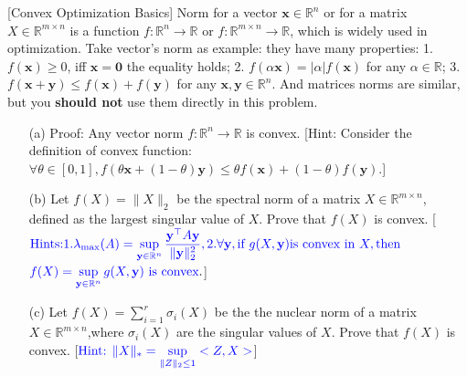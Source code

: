 \item {} [Convex Optimization Basics] Norm for a vector $\mathbf{x}\in\mathbb{R}^n$ or for a matrix $X\in\mathbb{R}^{m\times n}$ is a function $f:\mathbb{R}^{n}\rightarrow\mathbb{R}$ or $f:\mathbb{R}^{m\times n}\rightarrow\mathbb{R}$, which is widely used in optimization. Take vector's norm as example: they have many properties: 1. $f(\mathbf{x})\geq 0$, iff $\mathbf{x}=\mathbf{0}$ the equality holds; 2. $f(\alpha\mathbf{x})=|\alpha| f(\mathbf{x})$ for any $\alpha\in\mathbb{R}$; 3. $f(\mathbf{x}+\mathbf{y})\leq f(\mathbf{x})+f(\mathbf{y})$ for any $\mathbf{x},\mathbf{y}\in\mathbb{R}^n$. And matrices norms are similar, but you \textbf{should not} use them directly in this problem.
\begin{itemize}
    \item[(a)] Proof: Any vector norm $f:\mathbb{R}^{n}\rightarrow\mathbb{R}$ is convex. [Hint: Consider the definition of convex function: $\forall\theta\in[0,1], f(\theta\mathbf{x}+(1-\theta)\mathbf{y})\leq \theta f(\mathbf{x})+(1-\theta)f(\mathbf{y})$.] ~
    \item[(b)] Let $f(X) = \|X\|_2$ be the spectral norm of a matrix $X \in \mathbb{R}^{m \times n}$, defined as the largest singular value of $X$. Prove that $f(X)$ is convex. [$\textcolor{blue}{\text{Hints:} 1. \lambda_{\max}(A)=\sup\limits_{\mathbf{y}\in\mathbb{R}^n}\dfrac{\mathbf{y}^{\top}A\mathbf{y}}{\|\mathbf{y}\|_2^2}, 2. \forall\mathbf{y}, \text{if } g(X,\mathbf{y}) \text{is convex in } X, \text{then }}$ $\textcolor{blue}{f(X)=\sup\limits_{\mathbf{y}\in\mathbb{R}^n}g(X,\mathbf{y}) \text{ is convex}}.$] 
    \item[(c)] Let $f(X) = \sum\limits_{i=1}^{r} \sigma_i(X)$ be the the nuclear norm of  a matrix $X \in \mathbb{R}^{m \times n}$,where $\sigma_i(X)$ are the singular values of $X$. Prove that $f(X)$ is convex. [$\textcolor{blue}{\text{Hint: } \|X\|_* = \sup\limits_{\|Z\|_2 \leq 1} <Z,X>}$] 
\end{itemize}

\solution






\newpage